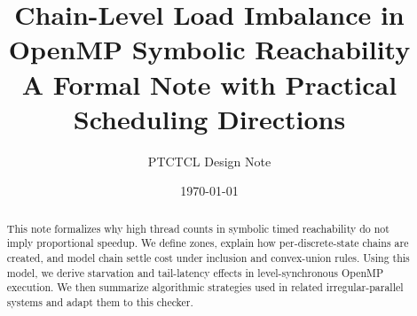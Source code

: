 \documentclass[11pt,a4paper]{article}
\title{Chain-Level Load Imbalance in OpenMP Symbolic Reachability\\
A Formal Note with Practical Scheduling Directions}
\author{PTCTCL Design Note}
\date{\today}
\begin{document}
\maketitle

\begin{abstract}
This note formalizes why high thread counts in symbolic timed reachability do not imply proportional speedup.
We define zones, explain how per-discrete-state chains are created, and model chain settle cost under inclusion and convex-union rules.
Using this model, we derive starvation and tail-latency effects in level-synchronous OpenMP execution.
We then summarize algorithmic strategies used in related irregular-parallel systems and adapt them to this checker.
\end{abstract}








\end{document}
